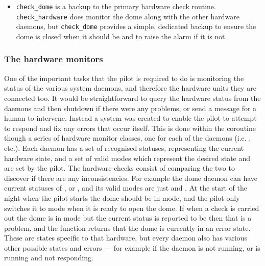 \begin{colsection}
\begin{colsection}
\begin{itemize}
\item \texttt{check\_dome} is a backup to the primary hardware check routine. \texttt{check\_hardware} does monitor the dome along with the other hardware daemons, but \texttt{check\_dome} provides a simple, dedicated backup to ensure the dome is closed when it should be and to raise the alarm if it is not.

\end{itemize}

\subsubsection{The hardware monitors}

One of the important tasks that the pilot is required to do is monitoring the status of the various system daemons, and therefore the hardware units they are connected too. It would be straightforward to query the hardware status from the daemons and then shutdown if there were any problems, or send a message for a human to intervene. Instead a system was created to enable the pilot to attempt to respond and fix any errors that occur itself. This is done within the  coroutine though a series of hardware monitor  classes, one for each of the daemons (i.e. ,  etc.). Each daemon has a set of recognised statuses, representing the current hardware state, and a set of valid modes which represent the desired state and are set by the pilot. The hardware checks consist of comparing the two to discover if there are any inconsistencies. For example the dome daemon can have current statuses of ,  or , and its valid modes are just  and . At the start of the night when the pilot starts the dome should be in  mode, and the pilot only switches it to  mode when it is ready to open the dome. If when a check is carried out the dome is in  mode but the current status is reported to be  then that is a problem, and the function returns that the dome is currently in an error state. These are states specific to that hardware, but every daemon also has various other possible states and errors --- for example if the daemon is not running, or is running and not responding.


\end{colsection}
\end{colsection}
